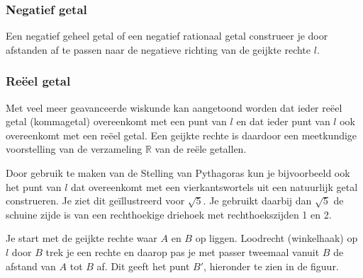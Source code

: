 \subsubsection{Negatief getal}

%


Een negatief geheel getal of een negatief rationaal getal construeer je door afstanden af te passen naar de negatieve richting van de geijkte rechte $l$.

\subsubsection{Re\"eel getal}

Met veel meer geavanceerde wiskunde kan aangetoond worden dat ieder re\"eel getal (kommagetal) overeenkomt met een punt van $l$ en dat ieder punt van $l$ ook overeenkomt met een re\"eel getal. Een geijkte rechte is daardoor een meetkundige voorstelling van de verzameling $\mathbb{R}$ van de re\"ele getallen.\vspace{2mm}

Door gebruik te maken van de Stelling van Pythagoras kun je bijvoorbeeld ook het punt van $l$ dat overeenkomt met een vierkantswortels uit een natuurlijk getal construeren.
Je ziet dit ge\"illustreerd voor $\sqrt{5}$.
Je gebruikt daarbij dan $\sqrt{5}$ de schuine zijde is van een rechthoekige driehoek met rechthoekszijden 1 en 2.\vspace{5mm}

Je start met de geijkte rechte waar $A$ en $B$ op liggen.
Loodrecht (winkelhaak) op $l$ door $B$ trek je een rechte en daarop pas je met passer tweemaal vanuit $B$ de afstand van $A$ tot $B$ af.
Dit geeft het punt $B'$, hieronder te zien in de figuur.

